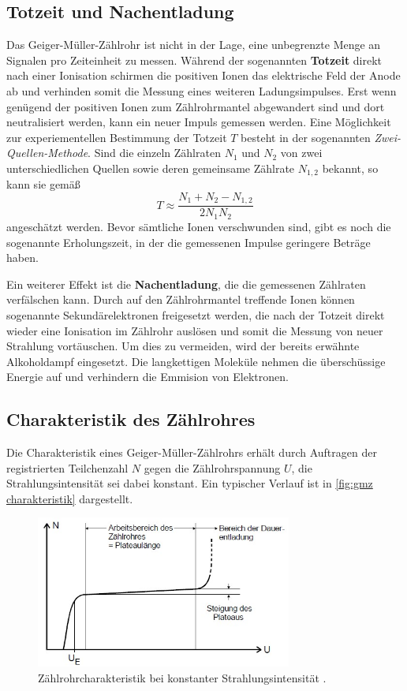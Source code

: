 \subsection{Totzeit und Nachentladung}
\label{sec:Totzeit}
Das Geiger-Müller-Zählrohr ist nicht in der Lage, eine unbegrenzte Menge an Signalen pro Zeiteinheit zu messen.
Während der sogenannten \textbf{Totzeit} direkt nach einer Ionisation schirmen die positiven Ionen das elektrische Feld der Anode ab
und verhinden somit die Messung eines weiteren Ladungsimpulses.
Erst wenn genügend der positiven Ionen zum Zählrohrmantel abgewandert sind und dort neutralisiert werden, kann ein neuer Impuls gemessen werden.
Eine Möglichkeit zur experiementellen Bestimmung der Totzeit $T$ besteht in der sogenannten \textit{Zwei-Quellen-Methode}.
Sind die einzeln Zählraten $N_1$ und $N_2$ von zwei unterschiedlichen Quellen sowie deren gemeinsame
Zählrate $N_{1,2}$ bekannt, so kann sie gemäß
\begin{equation}
    \label{eq:2 Quellen}
    T \approx \frac{N_1 + N_2 - N_{1,2}}{2N_1 N_2}
\end{equation}
angeschätzt werden.
Bevor sämtliche Ionen verschwunden sind, gibt es noch die sogenannte Erholungszeit, in der die gemessenen Impulse
geringere Beträge haben.

Ein weiterer Effekt ist die \textbf{Nachentladung}, die die gemessenen Zählraten verfälschen kann.
Durch auf den Zählrohrmantel treffende Ionen können sogenannte Sekundärelektronen freigesetzt werden, die
nach der Totzeit direkt wieder eine Ionisation im Zählrohr auslösen und somit die Messung von neuer Strahlung vortäuschen.
Um dies zu vermeiden, wird der bereits erwähnte Alkoholdampf eingesetzt. Die langkettigen Moleküle nehmen
die überschüssige Energie auf und verhindern die Emmision von Elektronen.

\subsection{Charakteristik des Zählrohres}
Die Charakteristik eines Geiger-Müller-Zählrohrs erhält durch Auftragen der registrierten Teilchenzahl $N$
gegen die Zählrohrspannung $U$, die Strahlungsintensität sei dabei konstant. Ein typischer Verlauf ist
in \autoref{fig:gmz charakteristik} dargestellt.

\begin{figure}[H]
    \centering
    \includegraphics[height=5cm]{content/pics/charakteristik.jpg}
    \caption{Zählrohrcharakteristik bei konstanter Strahlungsintensität \cite{v703}.}
    \label{fig:gmz charakteristik}
\end{figure}

